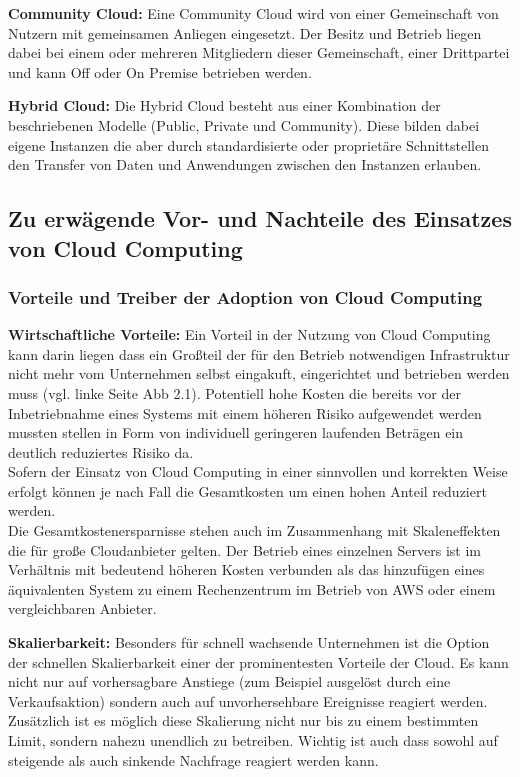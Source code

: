 \begin{spacing}{1.2}
\textbf{Community Cloud:} Eine Community Cloud wird von einer Gemeinschaft von Nutzern mit gemeinsamen
Anliegen eingesetzt. Der Besitz und Betrieb liegen dabei bei einem oder mehreren
Mitgliedern dieser Gemeinschaft, einer Drittpartei und kann Off oder On Premise betrieben
werden.

\textbf{Hybrid Cloud:} Die Hybrid Cloud besteht aus einer Kombination der beschriebenen Modelle
(Public, Private und Community). Diese bilden dabei eigene Instanzen die aber durch
standardisierte oder proprietäre Schnittstellen den Transfer von Daten und Anwendungen
zwischen den Instanzen erlauben.

\subsection{Zu erwägende Vor- und Nachteile des Einsatzes von Cloud Computing}

\subsubsection{\textbf{Vorteile und Treiber der Adoption von Cloud Computing}}

\textbf{Wirtschaftliche Vorteile:} Ein Vorteil in der Nutzung von Cloud Computing
kann darin liegen dass ein Großteil der für den Betrieb notwendigen Infrastruktur
nicht mehr vom Unternehmen selbst eingakuft, eingerichtet und betrieben werden
muss (vgl. linke Seite Abb 2.1). Potentiell hohe Kosten die bereits vor der
Inbetriebnahme eines Systems mit einem höheren Risiko aufgewendet werden mussten
stellen in Form von individuell geringeren laufenden Beträgen ein deutlich
reduziertes Risiko da.\\
Sofern der Einsatz von Cloud Computing in einer sinnvollen und korrekten
Weise erfolgt können je nach Fall die Gesamtkosten um einen hohen Anteil reduziert
werden.\\
Die Gesamtkostenersparnisse stehen auch im Zusammenhang mit Skaleneffekten die für
große Cloudanbieter gelten. Der Betrieb eines einzelnen Servers ist im Verhältnis
mit bedeutend höheren Kosten verbunden als das hinzufügen eines äquivalenten
System zu einem Rechenzentrum im Betrieb von AWS oder einem vergleichbaren
Anbieter.

\textbf{Skalierbarkeit:} Besonders für schnell wachsende Unternehmen ist die
Option der schnellen Skalierbarkeit einer der prominentesten Vorteile der Cloud.
Es kann nicht nur auf vorhersagbare Anstiege (zum Beispiel ausgelöst durch
eine Verkaufsaktion) sondern auch auf unvorhersehbare Ereignisse reagiert werden.
Zusätzlich ist es möglich diese Skalierung nicht nur bis zu einem bestimmten Limit,
sondern nahezu unendlich zu betreiben. Wichtig ist auch dass sowohl auf steigende
als auch sinkende Nachfrage reagiert werden kann.


\end{spacing}
